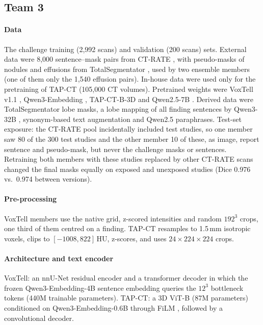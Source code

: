 \subsection{Team 3}
\label{app:team3}

\paragraph{Data} The challenge training (2,992 scans) and validation
(200 scans) sets. External data were 8,000 sentence--mask pairs from
CT-RATE \citep{hamamci2026generalist}, with pseudo-masks of nodules and effusions
from TotalSegmentator \citep{wasserthal2023totalsegmentator}, used by two
ensemble members (one of them only the 1,540 effusion pairs). In-house data
were used only for the pretraining of TAP-CT \citep{veenboer2025tap}
(105,000 CT volumes). Pretrained weights were VoxTell v1.1
\citep{rokuss2026voxtell}, Qwen3-Embedding \citep{zhang2025qwen3}, TAP-CT-B-3D
and Qwen2.5-7B \citep{yang2025qwen3}. Derived data were TotalSegmentator lobe
masks, a lobe mapping of all finding sentences by Qwen3-32B
\citep{yang2025qwen3}, synonym-based text augmentation and Qwen2.5 paraphrases.
Test-set exposure: the CT-RATE pool incidentally included test studies, so one
member saw 80 of the 300 test studies and the other member 10 of these,
as image, report sentence and pseudo-mask, but never the challenge masks or
sentences. Retraining both members with these studies replaced by other CT-RATE
scans changed the final masks equally on exposed and unexposed studies (Dice
0.976 vs.\ 0.974 between versions).

\paragraph{Pre-processing} VoxTell members use the native grid, z-scored
intensities and random $192^3$ crops, one third of them centred on a finding.
TAP-CT resamples to 1.5\,mm isotropic voxels, clips to $[-1008, 822]$\,HU,
z-scores, and uses $24 \times 224 \times 224$ crops.

\paragraph{Architecture and text encoder} VoxTell: an nnU-Net residual encoder
\citep{isensee2021nnu,isensee2024nnu} and a transformer decoder in which the
frozen Qwen3-Embedding-4B sentence embedding queries the $12^3$ bottleneck tokens
(440M trainable parameters). TAP-CT: a 3D ViT-B (87M parameters) conditioned on
Qwen3-Embedding-0.6B through FiLM \citep{perez2018film}, followed by a
convolutional decoder.

